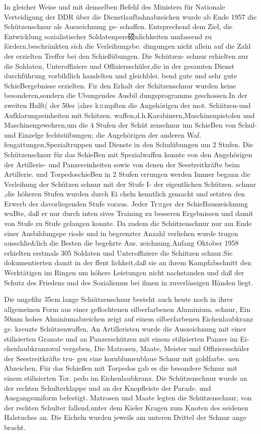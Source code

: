 

In gleicher Weise und mit demselben Befehl des
Ministers für Nationale Verteidigung der DDR
über die Dienstlaufbahnabzeichen wurde ab Ende
1957 die Schützenschnur als Auszeichnung ge-
schaffen. Entsprechend dem Ziel, die Entwicklung sozialistischer Soldatenpers硕nlichkeiten umfassend
zu fördern,beschränkten sich die Verleihungsbe.
dingungen nicht allein auf die Zahl der erzielten
Treffer bei den Schießübungen. Die Schützen-
schnur erhielten nur die Soldaten, Unteroffiziere
und Offiziersschüler,die in der gesamten Dienst
durchführung vorbildlich handelten und gleichblei.
bend gute und sehr gute SchieBergebnisse erzielten.
Fir den Erhalt der Schitzenschnur wurden keine
besonderen,sondern die Ubungendes Ausbil
dungsprogramms geschossen.In der zweiten Halft(
der 50er |ahre k¤mpften die Angehörigen der mot.
Schiitzen-und Aufklarungseinheiten mit Schitzen.
waffen,d.h.Karabinern,Maschinenpistolen und
Maschinengewehren,um die 4 Stufen der Schüt
zenschnur inn SchieBen von Schul- und Einzelge
fechtsüibungen; die Angehörigen der anderen Waf.
fengattungen,Spezialtruppen und Dienste in den
Schulübungen um 2 Stufen. Die Schützenschnur
für das SchieBen mit Spezialwaffen konnte von den
Angehörigen der Artillerie- und Panzereinheiten
sowie von denen der Seestreitkräfte beim Artillerie.
und TorpedoschieBen in 2 Stufen errungen werden
Immer begann die Verleihung der Schützen
schnur mit der Stufe I- der eigentlichen Schützen.
schnur ,die höheren Stufen wurden durch Ei
cheln kenntlich gemacht und setzten den Erwerb
der davorliegenden Stufe voraus. Jeder Tr¤ger der
SchieBauszeichnung wuBte, daß er nur durch inten
sives Training zu besseren Ergebnissen und damit
von Stufe zu Stufe gelangen konnte. Da zudem dic
Schützenschnur nur am Ende einer Ausbildungspe
riode und in begrenzter Anzahl verliehen wurde
trugen ausschlie&lich die Besten die begehrte Aus.
zeichnung.Anfang Oktober 1958 erhielten erstmals
305 Soldaten und Unteroffiziere die Schiitzen
schnur.Sie dokumentierten damit in der ffent
lichkeit,daß sie an ihrem Kampfabschnitt den
Werktätigen im Ringen um hóhere Leistungen
nicht nachstanden und daß der Schutz des Friedens
und des Sozialismus bei ihnen in zuverlässigen
Händen liegt.

Die ungefihr 35cm lange Schiützenschnur besteht auch heute noch in ihrer allgemeinen Form
aus einer geflochtenen silberfarbenen Aluminium.
schnur, Ein 50mm hohes Alminiumabzeichen
zeigt auf einem silberfarbenen Eichenlaubkranz ge.
kreuzte Schützenwaffen, An Artilleristen wurde die
Auszeichnung mit einer stilisierten Granate und an
Panzerschützen mit einem stilisierten Panzer im Ei-
chenlaubkranzoval vergeben, Die Matrosen, Maate,
Meister und Offiziersschüler der Seestreitkräfte tru-
gen eine kornblumenblaue Schnur mit goldfarbe.
nen Abzeichen, Für das Schießen mit Torpedos gab
es die besondere Schnur mit einem stilisierten Tor.
pedo im Eichenlaubkranz.
Die Schützenschnur wurde an der rechten
Schulterklappe und an der Knopfleiste der Parade.
und Ausgangsuniform befestigt. Matrosen und
Maate legten die Schützenschnur, von der rechten
Schulter fallend,unter dem Kieler Kragen zum
Knoten des seidenen Halstuches an. Die Eicheln
wurden jeweils am unteren Drittel der Schnur ange
bracht.